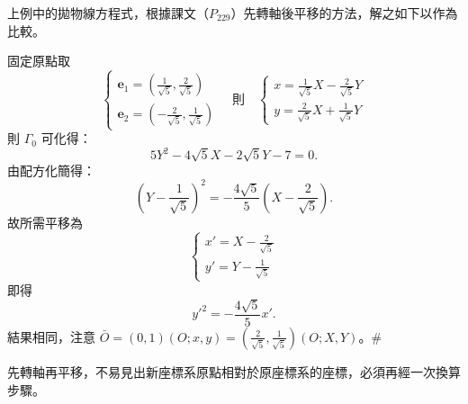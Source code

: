 \begin{example}
上例中的拋物線方程式，根據課文（$P_{229}$）先轉軸後平移的方法，解之如下以作為比較。

固定原點取
\[
\begin{cases}
\mathbf{e}_1 = \left(\frac{1}{\sqrt{5}}, \frac{2}{\sqrt{5}}\right) \\
\mathbf{e}_2 = \left(-\frac{2}{\sqrt{5}}, \frac{1}{\sqrt{5}}\right)
\end{cases}
\quad \text{則} \quad
\begin{cases}
x = \frac{1}{\sqrt{5}}X - \frac{2}{\sqrt{5}}Y \\
y = \frac{2}{\sqrt{5}}X + \frac{1}{\sqrt{5}}Y
\end{cases}
\]
則 $\Gamma_0$ 可化得：
\[
5Y^2-4\sqrt{5}X-2\sqrt{5}Y-7=0.
\]
由配方化簡得：
\[
\left(Y-\frac{1}{\sqrt{5}}\right)^2 = -\frac{4\sqrt{5}}{5}\left(X-\frac{2}{\sqrt{5}}\right).
\]
故所需平移為
\[
\begin{cases}
x' = X - \frac{2}{\sqrt{5}} \\
y' = Y - \frac{1}{\sqrt{5}}
\end{cases}
\]
即得
\[
{y'}^2 = -\frac{4\sqrt{5}}{5}x'.
\]
結果相同，注意 $\bar{O}=(0, 1)(O; x, y) = \left(\frac{2}{\sqrt{5}}, \frac{1}{\sqrt{5}}\right)(O; X, Y)$。\hfill $\#$
\end{example}

先轉軸再平移，不易見出新座標系原點相對於原座標系的座標，必須再經一次換算步驟。
